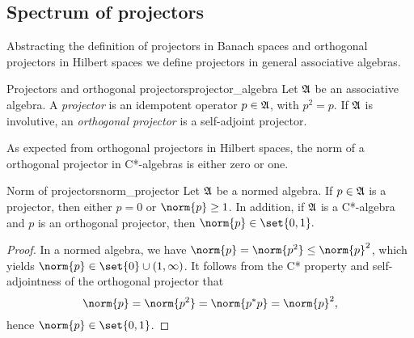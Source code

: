 \subsection{Spectrum of projectors}
Abstracting the definition of projectors in Banach spaces and orthogonal projectors in Hilbert spaces we define projectors in general associative algebras.
\begin{definition}{Projectors and orthogonal projectors}{projector_algebra}
    Let \(\mathfrak{A}\) be an associative algebra. A \emph{projector} is an idempotent operator \(p \in \mathfrak{A}\), with \(p^2 = p\). If \(\mathfrak{A}\) is involutive, an \emph{orthogonal projector} is a self-adjoint projector.
\end{definition}

As expected from orthogonal projectors in Hilbert spaces, the norm of a orthogonal projector in C*-algebras is either zero or one.
\begin{proposition}{Norm of projectors}{norm_projector}
    Let \(\mathfrak{A}\) be a normed algebra. If \(p\in \mathfrak{A}\) is a projector, then either \(p = 0\) or \(\norm{p} \geq 1\). In addition, if \(\mathfrak{A}\) is a C*-algebra and \(p\) is an orthogonal projector, then \(\norm{p} \in \set{0,1}.\)
\end{proposition}
\begin{proof}
    In a normed algebra, we have \( \norm{p} = \norm{p^2} \leq \norm{p}^2\), which yields \(\norm{p} \in \set{0}\cup(1,\infty)\). It follows from the C* property and self-adjointness of the orthogonal projector that
    \begin{equation*}
        \norm{p} = \norm{p^2} = \norm{p^*p} = \norm{p}^2,
    \end{equation*}
    hence \(\norm{p} \in \set{0,1}\).
\end{proof}

